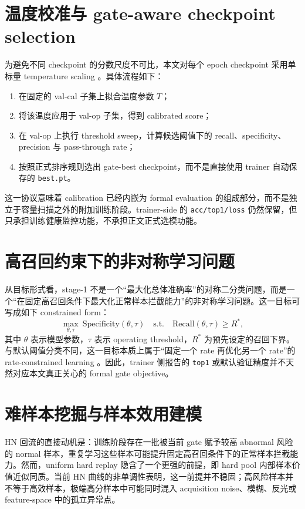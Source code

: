 \documentclass[UTF8,openany,12pt]{ctexbook}
\newcommand{\formalmetric}[1]{\texttt{#1}}
\begin{document}
\section{温度校准与 gate-aware checkpoint selection}
为避免不同 checkpoint 的分数尺度不可比，本文对每个 epoch checkpoint 采用单标量 temperature scaling \cite{guo2017calibration}。具体流程如下：
\begin{enumerate}[label=\arabic*.]
    \item 在固定的 val-cal 子集上拟合温度参数 $T$；
    \item 将该温度应用于 val-op 子集，得到 calibrated score；
    \item 在 val-op 上执行 threshold sweep，计算候选阈值下的 recall、specificity、precision 与 pass-through rate；
    \item 按照正式排序规则选出 gate-best checkpoint，而不是直接使用 trainer 自动保存的 \texttt{best.pt}。
\end{enumerate}

这一协议意味着 calibration 已经内嵌为 formal evaluation 的组成部分，而不是独立于容量扫描之外的附加训练阶段。trainer-side 的 \formalmetric{acc/top1/loss} 仍然保留，但只承担训练健康监控功能，不承担正文正式选模功能。

\section{高召回约束下的非对称学习问题}
从目标形式看，stage-1 不是一个“最大化总体准确率”的对称二分类问题，而是一个“在固定高召回条件下最大化正常样本拦截能力”的非对称学习问题。这一目标可写成如下 constrained form：
\begin{equation}
\max_{\theta,\tau}\ \mathrm{Specificity}(\theta,\tau)
\quad
\text{s.t.}\quad
\mathrm{Recall}(\theta,\tau)\ge R^\ast,
\end{equation}
其中 $\theta$ 表示模型参数，$\tau$ 表示 operating threshold，$R^\ast$ 为预先设定的召回下界。与默认阈值分类不同，这一目标本质上属于“固定一个 rate 再优化另一个 rate”的 rate-constrained learning \cite{kumar2021constrained}。因此，trainer 侧报告的 \formalmetric{top1} 或默认验证精度并不天然对应本文真正关心的 formal gate objective。

\section{难样本挖掘与样本效用建模}
HN 回流的直接动机是：训练阶段存在一批被当前 gate 赋予较高 abnormal 风险的 normal 样本，重复学习这些样本可能提升固定高召回条件下的正常样本拦截能力。然而，uniform hard replay 隐含了一个更强的前提，即 hard pool 内部样本价值近似同质。当前 HN 曲线的非单调性表明，这一前提并不稳固；高风险样本并不等于高效样本，极端高分样本中可能同时混入 acquisition noise、模糊、反光或 feature-space 中的孤立异常点。
\end{document}
